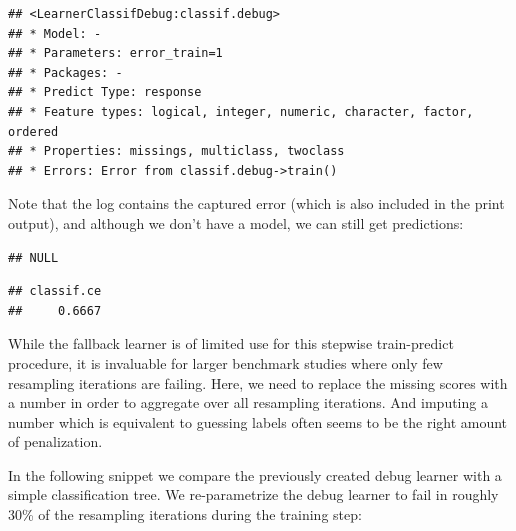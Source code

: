 \documentclass[]{scrbook}
\newenvironment{Shaded}{\begin{snugshade}}{\end{snugshade}}
\newcommand{\KeywordTok}[1]{\textcolor[rgb]{0.13,0.29,0.53}{\textbf{#1}}}
\newcommand{\NormalTok}[1]{#1}
\newcommand{\OperatorTok}[1]{\textcolor[rgb]{0.81,0.36,0.00}{\textbf{#1}}}
\newcommand{\StringTok}[1]{\textcolor[rgb]{0.31,0.60,0.02}{#1}}
\renewenvironment{Shaded} {\begin{snugshade}\small} {\end{snugshade}}
\begin{document}
\begin{verbatim}
## <LearnerClassifDebug:classif.debug>
## * Model: -
## * Parameters: error_train=1
## * Packages: -
## * Predict Type: response
## * Feature types: logical, integer, numeric, character, factor, ordered
## * Properties: missings, multiclass, twoclass
## * Errors: Error from classif.debug->train()
\end{verbatim}

Note that the log contains the captured error (which is also included in the print output), and although we don't have a model, we can still get predictions:

\begin{Shaded}
\end{Shaded}

\begin{verbatim}
## NULL
\end{verbatim}

\begin{Shaded}
\end{Shaded}

\begin{verbatim}
## classif.ce 
##     0.6667
\end{verbatim}

While the fallback learner is of limited use for this stepwise train-predict procedure, it is invaluable for larger benchmark studies where only few resampling iterations are failing.
Here, we need to replace the missing scores with a number in order to aggregate over all resampling iterations.
And imputing a number which is equivalent to guessing labels often seems to be the right amount of penalization.

In the following snippet we compare the previously created debug learner with a simple classification tree.
We re-parametrize the debug learner to fail in roughly 30\% of the resampling iterations during the training step:
\end{document}

